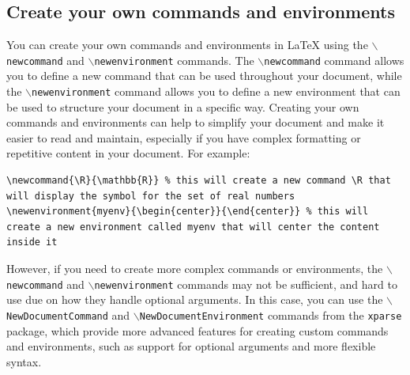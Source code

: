 \subsection{Create your own commands and environments}

You can create your own commands and environments in LaTeX using the \texttt{\(\backslash\)newcommand} and \texttt{\(\backslash\)newenvironment} commands. The \texttt{\(\backslash\)newcommand} command allows you to define a new command that can be used throughout your document, while the \texttt{\(\backslash\)newenvironment} command allows you to define a new environment that can be used to structure your document in a specific way. Creating your own commands and environments can help to simplify your document and make it easier to read and maintain, especially if you have complex formatting or repetitive content in your document. For example:
\begin{verbatim}
\newcommand{\R}{\mathbb{R}} % this will create a new command \R that will display the symbol for the set of real numbers
\newenvironment{myenv}{\begin{center}}{\end{center}} % this will create a new environment called myenv that will center the content inside it
\end{verbatim}

However, if you need to create more complex commands or environments, the \texttt{\(\backslash\)newcommand} and \texttt{\(\backslash\)newenvironment} commands may not be sufficient, and hard to use due on how they handle optional arguments. In this case, you can use the \texttt{\(\backslash\)NewDocumentCommand} and \texttt{\(\backslash\)NewDocumentEnvironment} commands from the \texttt{xparse} package, which provide more advanced features for creating custom commands and environments, such as support for optional arguments and more flexible syntax.
